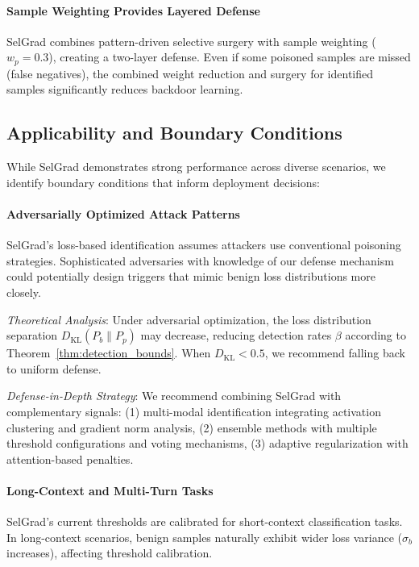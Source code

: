 \paragraph{Sample Weighting Provides Layered Defense}
SelGrad combines pattern-driven selective surgery with sample weighting ($w_p=0.3$), creating a two-layer defense. Even if some poisoned samples are missed (false negatives), the combined weight reduction and surgery for identified samples significantly reduces backdoor learning.

\subsection{Applicability and Boundary Conditions}

While SelGrad demonstrates strong performance across diverse scenarios, we identify boundary conditions that inform deployment decisions:

\paragraph{Adversarially Optimized Attack Patterns}
SelGrad's loss-based identification assumes attackers use conventional poisoning strategies. Sophisticated adversaries with knowledge of our defense mechanism could potentially design triggers that mimic benign loss distributions more closely.

\textit{Theoretical Analysis}: Under adversarial optimization, the loss distribution separation $D_{\text{KL}}(P_b \| P_p)$ may decrease, reducing detection rates $\beta$ according to Theorem~\ref{thm:detection_bounds}. When $D_{\text{KL}} < 0.5$, we recommend falling back to uniform defense.

\textit{Defense-in-Depth Strategy}: We recommend combining SelGrad with complementary signals: (1) multi-modal identification integrating activation clustering and gradient norm analysis, (2) ensemble methods with multiple threshold configurations and voting mechanisms, (3) adaptive regularization with attention-based penalties.

\paragraph{Long-Context and Multi-Turn Tasks}
SelGrad's current thresholds are calibrated for short-context classification tasks. In long-context scenarios, benign samples naturally exhibit wider loss variance ($\sigma_b$ increases), affecting threshold calibration.

